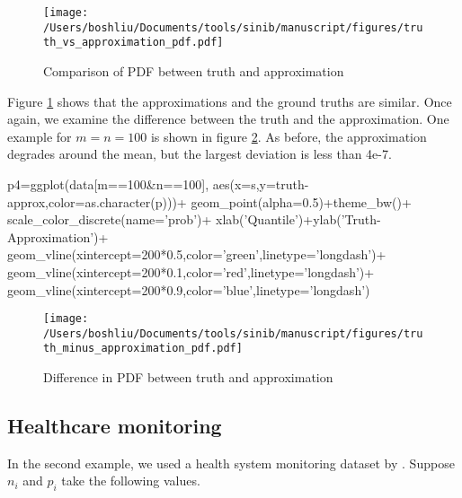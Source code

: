
\begin{figure}[h]
\texttt{[image: /Users/boshliu/Documents/tools/sinib/manuscript/figures/truth\_vs\_approximation\_pdf.pdf]}
\caption{Comparison of PDF between truth and approximation}
\label{fig:3}
\end{figure}

Figure \ref{fig:3} shows that the approximations and the ground truths are similar. Once again, we examine the difference between the truth and the approximation. One example for $m=n=100$ is shown in figure \ref{fig:4}. As before, the approximation degrades around the mean, but the largest deviation is less than 4e-7.


\begin{example}
p4=ggplot(data[m==100&n==100],
	aes(x=s,y=truth-approx,color=as.character(p)))+
	geom_point(alpha=0.5)+theme_bw()+
	scale_color_discrete(name='prob')+
	xlab('Quantile')+ylab('Truth-Approximation')+
	geom_vline(xintercept=200*0.5,color='green',linetype='longdash')+
	geom_vline(xintercept=200*0.1,color='red',linetype='longdash')+
	geom_vline(xintercept=200*0.9,color='blue',linetype='longdash')
\end{example}

\begin{figure}[h]
\texttt{[image: /Users/boshliu/Documents/tools/sinib/manuscript/figures/truth\_minus\_approximation\_pdf.pdf]}
\caption{Difference in PDF between truth and approximation}
\label{fig:4}
\end{figure}


\subsection{Healthcare monitoring}
In the second example, we used a health system monitoring dataset by \cite{Benneyan:2010ex}. Suppose $n_i$ and $p_i$ take the following values. 

